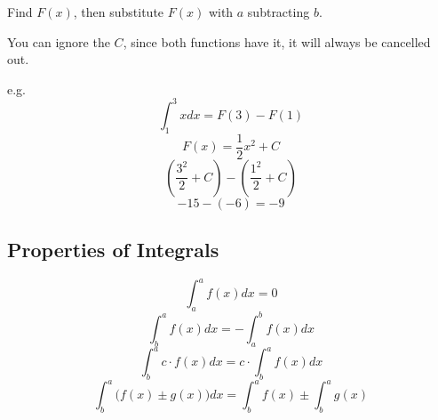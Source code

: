 \documentclass[a4paper,12pt]{article}
\begin{document}
Find $F(x)$, then substitute $F(x)$ with $a$ subtracting $b$.

You can ignore the $C$, since both functions have it, it will always be cancelled out.

e.g. $$\int^3_1{x}dx = F(3) - F(1)$$
$$F(x) = \frac{1}{2}x^2 + C$$
$$(\frac{3^2}{2} + C) - (\frac{1^2}{2} + C)$$
$$-15 - (-6) = -9$$

\subsection{Properties of Integrals}
$$\int_a^a{f(x)}dx = 0$$
$$\int^a_b{f(x)}dx = -\int^b_a{f(x)}dx$$
$$\int^a_b{c \cdot f(x)}dx = c\cdot\int^a_b{f(x)}dx$$
$$\int^a_b{\Big( f(x) \pm g(x) \Big)}dx = \int^a_b{f(x)} \pm \int^a_b{g(x)}$$
\end{document}

